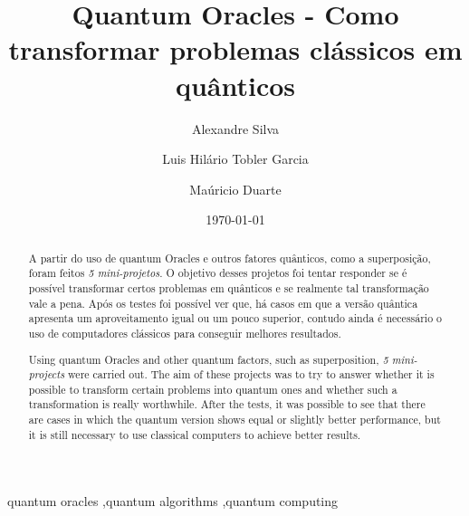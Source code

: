 \documentclass[12pt]{elsarticle}
\begin{document}
\begin{frontmatter}

\title{Quantum Oracles - Como transformar problemas clássicos em quânticos}

\date{ \today }

\author[1,*]{Alexandre Silva}
\author[1]{Luis Hilário Tobler Garcia}
\author[2]{Maúricio Duarte}

\address[1]{UNIVEM - Centro Universitário Eurípides de Marília, Avenida Hygino Muzzi Filho, Marília-SP}
\address[2]{Fatec Garça – Deputado Julio Julinho Marcondes de Moura, Av. Pres. Vargas, 2331 - José Ribeiro, Garça-SP}

\address[*]{Autor para correspondência: alexandresilvaunivem@gmail.com}


\begin{abstract}
\begin{resumop}
A partir do uso de quantum Oracles e outros fatores quânticos, como a superposição, foram feitos \emph{5 mini-projetos}. O objetivo desses projetos foi tentar responder se é possível transformar certos problemas em quânticos e se realmente tal transformação vale a pena. Após os testes foi possível ver que, há casos em que a versão quântica apresenta um aproveitamento igual ou um pouco superior, contudo ainda é necessário o uso de computadores clássicos para conseguir melhores resultados.
\end{resumop}

\begin{resumoi}
Using quantum Oracles and other quantum factors, such as superposition, \emph{5 mini-projects} were carried out. The aim of these projects was to try to answer whether it is possible to transform certain problems into quantum ones and whether such a transformation is really worthwhile. After the tests, it was possible to see that there are cases in which the quantum version shows equal or slightly better performance, but it is still necessary to use classical computers to achieve better results.
\end{resumoi}
\end{abstract}

\begin{keyword}
quantum oracles \sep quantum algorithms \sep quantum computing
\end{keyword}

\end{frontmatter}
\end{document}

